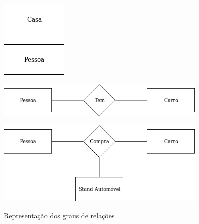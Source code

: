\documentclass[11pt,twoside,a4paper]{report}
\begin{document}
\vspace{2cm}
\begin{figure}[H]
	\centering
	\begin{minipage}{0.5\textwidth}
		\vspace{-1cm}
		\begin{center}
			\includegraphics[width=.25\textwidth]{notacao3} %
			\label{fig:der31}
		\end{center}
	\end{minipage}%
	\begin{minipage}{0.5\textwidth}
		\begin{center}
			\includegraphics[width=0.9\textwidth]{notacao4} %
			\label{fig:der32}
		\end{center}
	\end{minipage}
	\begin{minipage}{0.5\textwidth}
		\vspace{1cm}
		\begin{center}
			\includegraphics[width=0.9\textwidth]{notacao5} %
			\label{fig:der33}
		\end{center}
	\end{minipage}
	\caption{Representação dos graus de relações}
	\label{fig:der3}
\end{figure}
\end{document}

